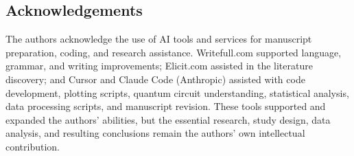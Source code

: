 \documentclass[pdflatex,sn-mathphys-num]{sn-jnl}
\theoremstyle{thmstyleone}%
\theoremstyle{thmstyletwo}%
\theoremstyle{thmstylethree}%
\begin{document}
\subsection*{Acknowledgements}

The authors acknowledge the use of AI tools and services for manuscript preparation, coding, and research assistance. Writefull.com supported language, grammar, and writing improvements; Elicit.com assisted in the literature discovery; and Cursor and Claude Code (Anthropic) assisted with code development, plotting scripts, quantum circuit understanding, statistical analysis, data processing scripts, and manuscript revision. These tools supported and expanded the authors' abilities, but the essential research, study design, data analysis, and resulting conclusions remain the authors' own intellectual contribution.


\end{document}
